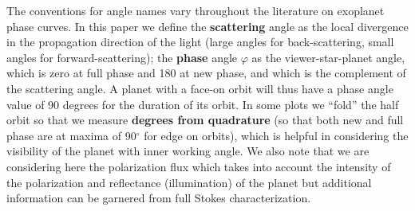 \documentclass[
    usenatbib,
]{mnras}
\begin{document}
The conventions for angle names vary throughout the literature on exoplanet phase curves. In this paper we define the \textbf{scattering} angle as the local divergence in the propagation direction of the light (large angles for back-scattering, small angles for forward-scattering); the \textbf{phase} angle $\varphi$ as the viewer-star-planet angle, which is zero at full phase and 180 at new phase, and which is the complement of the scattering angle. A planet with a face-on orbit will thus have a phase angle value of 90 degrees for the duration of its orbit. In some plots we ``fold'' the half orbit so that we measure \textbf{degrees from quadrature} (so that both new and full phase are at maxima of 90$^\circ$ for edge on orbits), which is helpful in considering the visibility of the planet with inner working angle. We also note that we are considering here the polarization flux which takes into account the intensity of the polarization and reflectance (illumination) of the planet but additional information can be garnered from full Stokes characterization.





 
\end{document}
